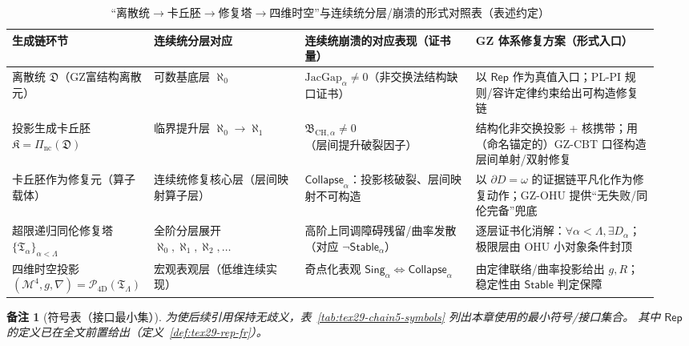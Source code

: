 \documentclass[12pt]{article}
\newtheorem{remark}{备注}[section]
\newcommand{\KouJing}{\texorpdfstring{表述约定}{表述约定}}
\newcommand{\GZMonFull}{\texorpdfstring{GZ富结构离散元}{GZ富结构离散元}}
\begin{document}
\begin{CJK*}{UTF8}{gkai}
\begin{table}[htbp]
\centering
{\footnotesize
\setlength{\tabcolsep}{2pt}
\renewcommand{\arraystretch}{1.25}
\begin{tabular}{|p{0.17\linewidth}|p{0.23\linewidth}|p{0.26\linewidth}|p{0.28\linewidth}|}
\hline
\textbf{生成链环节} & \textbf{连续统分层对应} & \textbf{连续统崩溃的对应表现（证书量）} & \textbf{GZ 体系修复方案（形式入口）} \\
\hline
离散统 $\mathfrak{D}$（\GZMonFull{}） & 可数基底层 $\aleph_0$ &
$\mathrm{JacGap}_{\alpha}\neq 0$（非交换法结构缺口证书） &
以 $\mathsf{Rep}$ 作为真值入口；PL-PI 规则/容许定律约束给出可构造修复链 \\
\hline
投影生成卡丘胚 $\mathfrak{K}=\Pi_{\mathrm{nc}}(\mathfrak{D})$ &
临界提升层 $\aleph_0\to\aleph_1$ &
$\mathfrak{B}_{\mathrm{CH},\alpha}\neq 0$（层间提升破裂因子） &
结构化非交换投影 + 核携带；用（命名锚定的）GZ-CBT 口径构造层间单射/双射修复 \\
\hline
卡丘胚作为修复元（算子载体） &
连续统修复核心层（层间映射算子层） &
$\mathsf{Collapse}_{\alpha}$：投影核破裂、层间映射不可构造 &
以 $\partial D=\omega$ 的证据链平凡化作为修复动作；GZ-OHU 提供“无失败/同伦完备”兜底 \\
\hline
超限递归同伦修复塔 $\{\mathfrak{T}_{\alpha}\}_{\alpha<\Lambda}$ &
全阶分层展开 $\aleph_0,\aleph_1,\aleph_2,\dots$ &
高阶上同调障碍残留/曲率发散（对应 $\neg\mathsf{Stable}_{\alpha}$） &
逐层证书化消解：$\forall \alpha<\Lambda,\exists D_{\alpha}$；极限层由 OHU 小对象条件封顶 \\
\hline
四维时空投影 $(\mathcal{M}^{4},g,\nabla)=\mathcal{P}_{\mathrm{4D}}(\mathfrak{T}_{\Lambda})$ &
宏观表观层（低维连续实现） &
奇点化表观 $\mathsf{Sing}_{\alpha}\Leftrightarrow \mathsf{Collapse}_{\alpha}$ &
由定律联络/曲率投影给出 $g,R$；稳定性由 $\mathsf{Stable}$ 判定保障 \\
\hline
\end{tabular}
}
\caption{\texorpdfstring{“离散统$\to$卡丘胚$\to$修复塔$\to$四维时空”}{“离散统->卡丘胚->修复塔->四维时空”}与连续统分层/崩溃的形式对照表（\KouJing）}
\label{tab:tex29-chain5-continuum-map}
\end{table}

\begin{remark}[符号表（接口最小集）]
为使后续引用保持无歧义，表~\ref{tab:tex29-chain5-symbols} 列出本章使用的最小符号/接口集合。
其中 $\mathsf{Rep}$ 的定义已在全文前置给出（定义~\ref{def:tex29-rep-fr}）。
\end{remark}


\end{CJK*}
\end{document}
